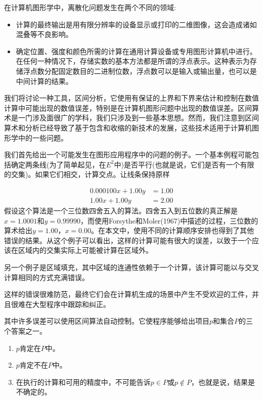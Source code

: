 \begin{CJK}{UTF8}{gbsn}
在计算机图形学中，离散化问题发生在两个不同的领域:

\begin{itemize}
\item 计算的最终输出是用有限分辨率的设备显示或打印的二维图像，这会造成诸如混叠等不良影响。


\item 确定位置、强度和颜色所需的计算在通用计算设备或专用图形计算机中进行。在任何一种情况下，存储实数的基本方法都是所谓的浮点表示。这种表示为存储浮点数分配固定数目的二进制位数，浮点数可以是输入或输出量，也可以是中间计算的结果。

\end{itemize}

我们将讨论一种工具，区间分析，它使用有保证的上界和下界来估计和控制在数值计算中可能出现的数值误差，特别是在计算机图形问题中出现的数值误差。区间算术是一门涉及面很广的学科，我们只涉及到一些基本思想。然而，我们注意到区间算术和分析已经导致了基于包含和收缩的新技术的发展，这些技术适用于计算机图形学中的一些问题。


我们首先给出一个可能发生在图形应用程序中的问题的例子。一个基本例程可能包括确定两条线(为了简单起见，在$E^{2}$中)是否平行(也就是说，它们是否有一个有限的交集)。如果它们相交，计算交点。让线条保持原样


\begin{align}
0.000100 x+1.00 y&=1.00 \\
1.00 x+1.00 y&=2.00
\end{align}
假设这个算法是一个三位数四舍五入的算法。四舍五入到五位数的真正解是$x=1.0001$和$y=0.99990$，而使用Forsythe和Moler(1967)中描述的过程，三位数的算术给出$y=1.00， x=0.00$。在本文中，使用不同的计算顺序安排也得到了其他错误的结果。从这个例子可以看出，这样的计算可能有很大的误差，以致于一个应该在区域内的交集实际上可能被计算在区域外。

另一个例子是区域填充，其中区域的连通性依赖于一个计算，该计算可能以与交叉计算相同的方式充满错误。

这样的错误很难防范，最终它们会在计算机生成的场景中产生不受欢迎的工件，并且很难在大型程序中跟踪和纠正。

其中许多误差可以使用区间算法自动控制。它使程序能够给出项目$p$和集合$P$的三个答案之一。


\begin{enumerate}
	\item $p$肯定在$P$中。


\item $p$肯定不在$P$中。


\item 在执行的计算和可用的精度中，不可能告诉$p \in P $或$p \notin P $，也就是说，结果是不确定的。
\end{enumerate}


\end{CJK}
